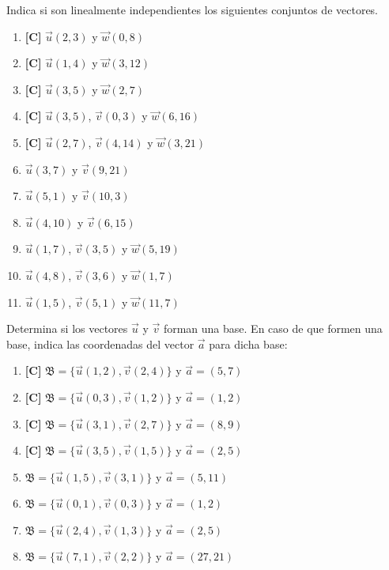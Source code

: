 \Exercicio Indica si son linealmente independientes los siguientes conjuntos de vectores.

\begin{enumerate}[topsep=0pt]
	\item \textbf{[C]} $\overrightarrow{u}(2,3)$ y $\overrightarrow{w}(0,8)$
	\item \textbf{[C]} $\overrightarrow{u}(1,4)$ y $\overrightarrow{w}(3, 12)$
	\item \textbf{[C]} $\overrightarrow{u}(3,5)$ y $\overrightarrow{w}(2,7)$
	\item \textbf{[C]} $\overrightarrow{u}(3,5)$, $\overrightarrow{v}(0,3)$ y $\overrightarrow{w}(6,16)$
	\item \textbf{[C]} $\overrightarrow{u}(2,7)$, $\overrightarrow{v}(4,14)$ y $\overrightarrow{w}(3,21)$
	
	\item $\overrightarrow{u}(3,7)$ y $\overrightarrow{v}(9,21)$
	\item $\overrightarrow{u}(5,1)$ y $\overrightarrow{v}(10,3)$
	\item $\overrightarrow{u}(4,10)$ y $\overrightarrow{v}(6,15)$
	\item $\overrightarrow{u}(1,7)$, $\overrightarrow{v}(3,5)$ y $\overrightarrow{w}(5,19)$
	\item $\overrightarrow{u}(4,8)$, $\overrightarrow{v}(3,6)$ y $\overrightarrow{w}(1,7)$
	\item $\overrightarrow{u}(1,5)$, $\overrightarrow{v}(5,1)$ y $\overrightarrow{w}(11,7)$
	
\end{enumerate}


\Exercicio Determina si los vectores $\overrightarrow{u}$ y $\overrightarrow{v}$ forman una base. En caso de que formen una base, indica las coordenadas del vector $\overrightarrow{a}$ para dicha base:

\begin{enumerate}[topsep=0pt]
	\item \textbf{[C]} $\mathfrak{B} = \{\overrightarrow{u}(1,2), \overrightarrow{v}(2,4)\}$ y $\overrightarrow{a} = (5,7)$
	\item \textbf{[C]} $\mathfrak{B} = \{\overrightarrow{u}(0,3), \overrightarrow{v}(1,2)\}$ y $\overrightarrow{a} = (1,2)$
	\item \textbf{[C]} $\mathfrak{B} = \{\overrightarrow{u}(3,1), \overrightarrow{v}(2,7)\}$ y $\overrightarrow{a} = (8,9)$
	\item \textbf{[C]} $\mathfrak{B} = \{\overrightarrow{u}(3,5), \overrightarrow{v}(1,5)\}$ y $\overrightarrow{a} = (2,5)$
	
	\item $\mathfrak{B} = \{\overrightarrow{u}(1,5), \overrightarrow{v}(3,1)\}$ y $\overrightarrow{a} = (5,11)$
	\item $\mathfrak{B} = \{\overrightarrow{u}(0,1), \overrightarrow{v}(0,3)\}$ y $\overrightarrow{a} = (1,2)$
	\item $\mathfrak{B} = \{\overrightarrow{u}(2,4), \overrightarrow{v}(1,3)\}$ y $\overrightarrow{a} = (2,5)$
	\item $\mathfrak{B} = \{\overrightarrow{u}(7,1), \overrightarrow{v}(2,2)\}$ y $\overrightarrow{a} = (27,21)$
\end{enumerate}


